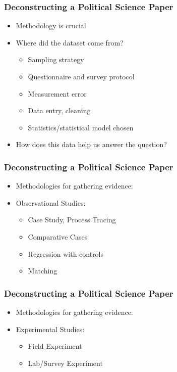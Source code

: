 \documentclass[xcolor=x11names,compress]{beamer}\usepackage[]{graphicx}\usepackage[]{color}
\renewcommand{\(}{\begin{columns}}
\renewcommand{\)}{\end{columns}}
\newcommand{\<}[1]{\begin{column}{#1}}
\renewcommand{\>}{\end{column}}
\begin{document}
\begin{frame}
\begin{frame}
\begin{frame}
\frametitle{Deconstructing a Political Science Paper}
\begin{itemize}
\item Methodology is crucial
\item Where did the dataset come from?
\begin{itemize}
\item Sampling strategy
\item Questionnaire and survey protocol
\item Measurement error
\item Data entry, cleaning
\item Statistics/statistical model chosen
\end{itemize}
\item How does this data help us answer the question?
\end{itemize}
\end{frame}

\begin{frame}
\frametitle{Deconstructing a Political Science Paper}
\begin{itemize}
\item Methodologies for gathering evidence:
\item Observational Studies:
\begin{itemize}
\item Case Study, Process Tracing
\item Comparative Cases
\item Regression with controls
\item Matching
\end{itemize}
\end{itemize}
\end{frame}

\begin{frame}
\frametitle{Deconstructing a Political Science Paper}
\begin{itemize}
\item Methodologies for gathering evidence:
\item Experimental Studies:
\begin{itemize}
\item Field Experiment
\item Lab/Survey Experiment
\end{itemize}
\end{itemize}
\end{frame}


\end{frame}
\end{frame}
\end{document}
